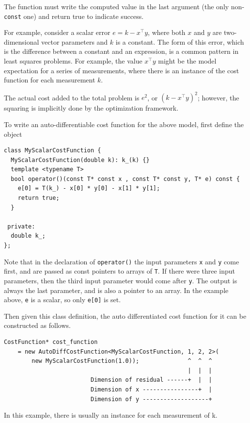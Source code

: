  The function must write the computed value in the last argument (the only
 non-\texttt{const} one) and return true to indicate success.

 For example, consider a scalar error $e = k - x^\top y$, where both $x$ and $y$ are
 two-dimensional vector parameters  and $k$ is a constant. The form of this error, which is the
 difference between a constant and an expression, is a common pattern in least
 squares problems. For example, the value $x^\top y$ might be the model expectation
 for a series of measurements, where there is an instance of the cost function
 for each measurement $k$.

 The actual cost added to the total problem is $e^2$, or $(k - x^\top y)^2$; however,
 the squaring is implicitly done by the optimization framework.

 To write an auto-differentiable cost function for the above model, first
 define the object
\begin{verbatim}
class MyScalarCostFunction {
  MyScalarCostFunction(double k): k_(k) {}
  template <typename T>
  bool operator()(const T* const x , const T* const y, T* e) const {
    e[0] = T(k_) - x[0] * y[0] - x[1] * y[1];
    return true;
  }

 private:
  double k_;
};
\end{verbatim}

Note that in the declaration of \texttt{operator()} the input parameters \texttt{x} and \texttt{y} come
 first, and are passed as const pointers to arrays of \texttt{T}. If there were three
 input parameters, then the third input parameter would come after \texttt{y}. The
 output is always the last parameter, and is also a pointer to an array. In
 the example above, \texttt{e} is a scalar, so only \texttt{e[0]} is set.

 Then given this class definition, the auto differentiated cost function for
 it can be constructed as follows.

\begin{verbatim}
CostFunction* cost_function
    = new AutoDiffCostFunction<MyScalarCostFunction, 1, 2, 2>(
        new MyScalarCostFunction(1.0));              ^  ^  ^
                                                     |  |  |
                         Dimension of residual ------+  |  |
                         Dimension of x ----------------+  |
                         Dimension of y -------------------+
\end{verbatim}

In this example, there is usually an instance for each measurement of k.

